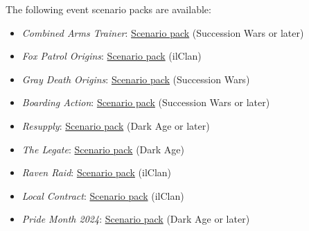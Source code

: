 The following event scenario packs are available:

\begin{itemize}

\item \emph{Combined Arms Trainer}: \href{https://raw.githubusercontent.com/Eudicods/outworlds-wastes/rules-pdf/combined-arms-trainer.pdf}{Scenario pack} (Succession Wars or later)

\item \emph{Fox Patrol Origins}: \href{https://raw.githubusercontent.com/Eudicods/outworlds-wastes/rules-pdf/fox-patrol-origins.pdf}{Scenario pack} (ilClan)

\item \emph{Gray Death Origins}: \href{https://raw.githubusercontent.com/Eudicods/outworlds-wastes/rules-pdf/gray-death-origins.pdf}{Scenario pack} (Succession Wars)

\item \emph{Boarding Action}: \href{https://raw.githubusercontent.com/Eudicods/outworlds-wastes/rules-pdf/boarding-action.pdf}{Scenario pack} (Succession Wars or later)

\item \emph{Resupply}: \href{https://raw.githubusercontent.com/Eudicods/outworlds-wastes/rules-pdf/resupply.pdf}{Scenario pack} (Dark Age or later)

\item \emph{The Legate}: \href{https://raw.githubusercontent.com/Eudicods/outworlds-wastes/rules-pdf/the-legate.pdf}{Scenario pack} (Dark Age)

\item \emph{Raven Raid}: \href{https://raw.githubusercontent.com/Eudicods/outworlds-wastes/rules-pdf/raven-raid.pdf}{Scenario pack} (ilClan)

\item \emph{Local Contract}: \href{https://raw.githubusercontent.com/Eudicods/outworlds-wastes/rules-pdf/local-contract.pdf}{Scenario pack} (ilClan)

\item \emph{Pride Month 2024}: \href{https://raw.githubusercontent.com/Eudicods/outworlds-wastes/rules-pdf/pride-2024.pdf}{Scenario pack} (Dark Age or later)

\end{itemize}
